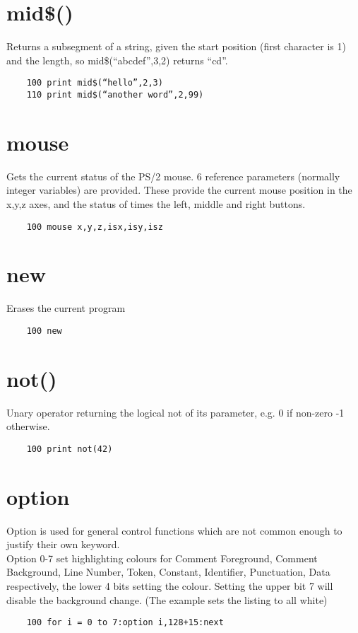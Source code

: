 \section*{mid\$()}
Returns a subsegment of a string, given the start position (first character is 1) and the length, so mid\$(“abcdef”,3,2) returns “cd”. 
\example{}
\begin{verbatim}
	100 print mid$(“hello”,2,3)
	110 print mid$(“another word”,2,99)
\end{verbatim}

\section*{mouse}
Gets the current status of the PS/2 mouse. 6 reference parameters (normally integer variables) are provided. These provide the current mouse position in the x,y,z axes, and the status of times the left, middle and right buttons.
\example{}
\begin{verbatim}
	100 mouse x,y,z,isx,isy,isz
\end{verbatim}

\section*{new}
Erases the current program
\example{}
\begin{verbatim}
	100 new
\end{verbatim}

\section*{not()}
Unary operator returning the logical not of its parameter, e.g. 0 if non-zero -1 otherwise.
\example{}
\begin{verbatim}
	100 print not(42)
\end{verbatim}

\section*{option}
Option is used for general control functions which are not common enough to justify their own keyword.\\
Option 0-7 set highlighting colours for Comment Foreground, Comment Background, Line Number, Token, Constant, Identifier, Punctuation, Data respectively, the lower 4 bits setting the colour. Setting the upper bit 7 will disable the background change. (The example sets the listing to all white)\\
\example{}
\begin{verbatim}
	100 for i = 0 to 7:option i,128+15:next
\end{verbatim}

